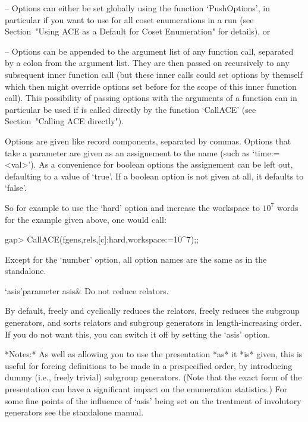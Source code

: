 \beginitems

\item{--}  Options  can either  be  set  globally  using the  function
`PushOptions', in particular  if you want to use  {\ACE} for all coset
enumerations in a {\GAP} run  (see Section~"Using ACE as a Default for
Coset Enumeration" for details), or


\item{--} Options can be appended to the argument list of any function
call,  separated by a  colon from  the argument  list.  They  are then
passed on recursively to any subsequent inner function call (but these
inner calls  could set options  by themself which then  might override
options set  before for the scope  of this inner  function call). This
possibility of passing options with the arguments of a function can in
particular  be used  if  {\ACE}  is called  directly  by the  function
`CallACE' (see Section~"Calling ACE directly").

\enditems

Options  are  given  like  record  components,  separated  by  commas.
Options that take a parameter are  given as an assignement to the name
(such  as `time:=<val>').  As  a convenience  for boolean  options the
assignement can  be left out, defaulting  to a value of  `true'.  If a
boolean option is not given at  all, it defaults to `false'. 


So for example to use the  `hard' option and increase the workspace to
$10^7$ words for the example given above, one would call:

\begintt
gap> CallACE(fgens,rels,[c]:hard,workspace:=10^7);;
\endtt

Except for  the `number' option, all  option names are the  same as in
the {\ACE} standalone.



\beginitems
\>`asis'{parameter asis}&
Do not reduce relators.
\enditems

By default, {\ACE} freely  and cyclically reduces the relators, freely
reduces  the  subgroup generators,  and  sorts  relators and  subgroup
generators in length-increasing  order.  If you do not  want this, you
can switch it off by setting the `asis' option.

*Notes:* As well as allowing you  to use the presentation *as* it *is*
given,  this  is  useful for  forcing  definitions  to  be made  in  a
prespecified  order,  by  introducing  dummy  (i.e.,  freely  trivial)
subgroup generators.   (Note that the  exact form of  the presentation
can  have a significant  impact on  the enumeration  statistics.)  For
some fine points of the influence of `asis' being set on the treatment
of involutory generators see the {\ACE} standalone manual.





